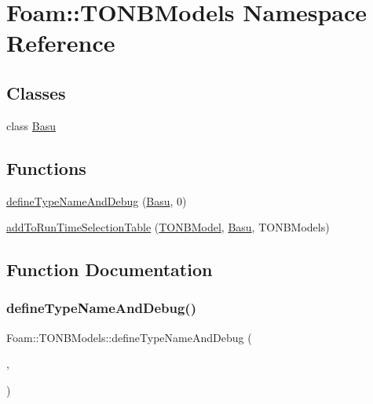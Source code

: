 \hypertarget{namespaceFoam_1_1TONBModels}{}\section{Foam\+:\+:T\+O\+N\+B\+Models Namespace Reference}
\label{namespaceFoam_1_1TONBModels}
\subsection*{Classes}
\begin{DoxyCompactItemize}
\item 
class \hyperlink{classFoam_1_1TONBModels_1_1Basu}{Basu}
\end{DoxyCompactItemize}
\subsection*{Functions}
\begin{DoxyCompactItemize}
\item 
\hyperlink{namespaceFoam_1_1TONBModels_ac3a54af4866fc705afceb61331115030}{define\+Type\+Name\+And\+Debug} (\hyperlink{classFoam_1_1TONBModels_1_1Basu}{Basu}, 0)
\item 
\hyperlink{namespaceFoam_1_1TONBModels_a09a29835c3e2d9e57b594f56a2feb54b}{add\+To\+Run\+Time\+Selection\+Table} (\hyperlink{classFoam_1_1TONBModel}{T\+O\+N\+B\+Model}, \hyperlink{classFoam_1_1TONBModels_1_1Basu}{Basu}, T\+O\+N\+B\+Models)
\end{DoxyCompactItemize}


\subsection{Function Documentation}
\mbox{\label{namespaceFoam_1_1TONBModels_ac3a54af4866fc705afceb61331115030}} 
\subsubsection{\texorpdfstring{define\+Type\+Name\+And\+Debug()}{defineTypeNameAndDebug()}}
{\footnotesize\ttfamily Foam\+::\+T\+O\+N\+B\+Models\+::define\+Type\+Name\+And\+Debug (\begin{DoxyParamCaption}\item[{\hyperlink{classFoam_1_1TONBModels_1_1Basu}{Basu}}]{,  }\item[{0}]{ }\end{DoxyParamCaption})}


